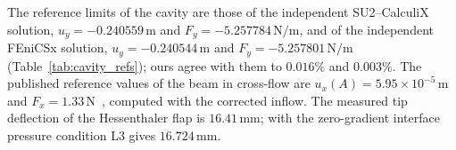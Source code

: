 The reference limits of the cavity are those of the independent SU2--CalculiX solution, $u_y = -0.240559\,\mathrm{m}$ and $F_y = -5.257784\,\mathrm{N/m}$, and of the independent FEniCSx solution, $u_y = -0.240544\,\mathrm{m}$ and $F_y = -5.257801\,\mathrm{N/m}$ (Table~\ref{tab:cavity_refs}); ours agree with them to $0.016\%$ and $0.003\%$.
The published reference values of the beam in cross-flow are $u_x(A) = 5.95\times10^{-5}\,\mathrm{m}$ and $F_x = 1.33\,\mathrm{N}$~\citep{Richter2012}, computed with the corrected inflow.
The measured tip deflection of the Hessenthaler flap is $16.41\,\mathrm{mm}$; with the zero-gradient interface pressure condition L3 gives $16.724\,\mathrm{mm}$.

